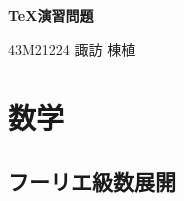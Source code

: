 \documentclass[11pt,a4paper]{jsarticle}
\begin{document}
\begin{center}
  {\Large\bfseries \TeX 演習問題} %
\end{center}
\begin{flushright}
  {\large 43M21224 諏訪 棟植} %
\end{flushright}

%
%

\section{数学}

\subsection{フーリエ級数展開}


\end{document}
